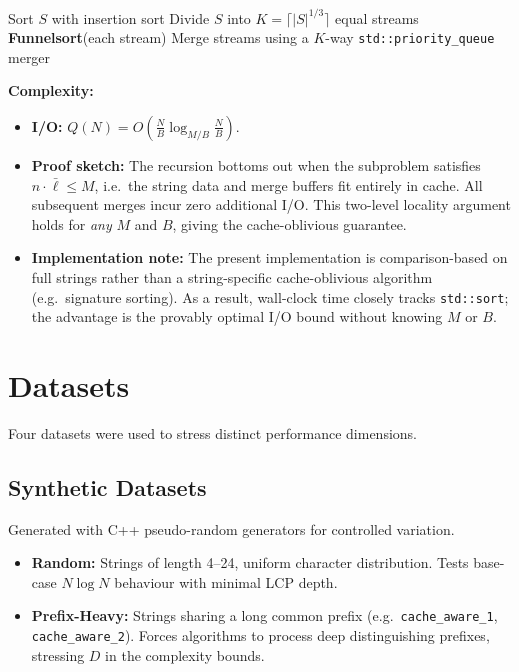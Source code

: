 \documentclass{article}
\begin{document}
\begin{algorithm}
\caption{Lazy Funnelsort ($S$)}
\begin{algorithmic}[1]
    \State Sort $S$ with insertion sort 
\Else
    \State Divide $S$ into $K = \lceil|S|^{1/3}\rceil$ equal streams
    \State \textbf{Funnelsort}(each stream)
    \State Merge streams using a $K$-way \texttt{std::priority\_queue} merger
\EndIf
\end{algorithmic}
\end{algorithm}

\textbf{Complexity:}
\begin{itemize}
  \item \textbf{I/O:} $Q(N) = O\!\left(\tfrac{N}{B}\log_{M/B}\tfrac{N}{B}\right)$.
  \item \textbf{Proof sketch:} The recursion bottoms out when the subproblem
        satisfies $n \cdot \bar\ell \le M$, i.e.\ the string data and merge
        buffers fit entirely in cache.  All subsequent merges incur zero
        additional I/O.  This two-level locality argument holds for \emph{any}
        $M$ and $B$, giving the cache-oblivious guarantee.
  \item \textbf{Implementation note:} The present implementation is
        comparison-based on full strings rather than a string-specific
        cache-oblivious algorithm (e.g.\ signature sorting).  As a result,
        wall-clock time closely tracks \texttt{std::sort}; the advantage is the
        provably optimal I/O bound without knowing $M$ or $B$.
\end{itemize}

\section{Datasets}

Four datasets were used to stress distinct performance dimensions.

\subsection{Synthetic Datasets}
Generated with C++ pseudo-random generators for controlled variation.
\begin{itemize}
  \item \textbf{Random:} Strings of length 4--24, uniform character distribution.
        Tests base-case $N \log N$ behaviour with minimal LCP depth.
  \item \textbf{Prefix-Heavy:} Strings sharing a long common prefix
        (e.g.\ \texttt{cache\_aware\_1}, \texttt{cache\_aware\_2}).  Forces
        algorithms to process deep distinguishing prefixes, stressing $D$ in the
        complexity bounds.
\end{itemize}
\end{document}
